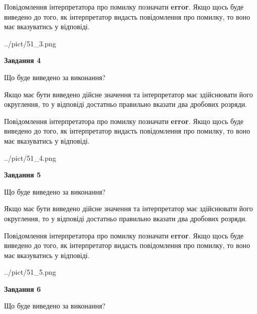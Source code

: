 \documentclass[12pt, ukrainian]{article}
\begin{document}
{\begin {Large}
Повідомлення інтерпретатора про помилку позначати \textbf{error}.
Якщо щось буде виведено до того, як інтерпретатор видасть повідомлення про помилку, 
то воно має вказуватись у відповіді. \par

\begin{center}
	{../pict/51_3.png}
\end{center}
\newpage

{\begin {center}\textbf{Завдання 4}\end {center}}\par
Що буде виведено за виконання? \par

Якщо має бути виведено дійсне значення та інтерпретатор має здійснювати його округлення, 
то у відповіді достатньо правильно вказати два дробових розряди.

Повідомлення інтерпретатора про помилку позначати \textbf{error}.
Якщо щось буде виведено до того, як інтерпретатор видасть повідомлення про помилку, 
то воно має вказуватись у відповіді. \par

\begin{center}
	{../pict/51_4.png}
\end{center}
\newpage

{\begin {center}\textbf{Завдання 5}\end {center}}\par
Що буде виведено за виконання? \par

Якщо має бути виведено дійсне значення та інтерпретатор має здійснювати його округлення, 
то у відповіді достатньо правильно вказати два дробових розряди.

Повідомлення інтерпретатора про помилку позначати \textbf{error}.
Якщо щось буде виведено до того, як інтерпретатор видасть повідомлення про помилку, 
то воно має вказуватись у відповіді. \par

\begin{center}
	{../pict/51_5.png}
\end{center}
\newpage

{\begin {center}\textbf{Завдання 6}\end {center}}\par
Що буде виведено за виконання? \par


\end{Large}}
\end{document}
